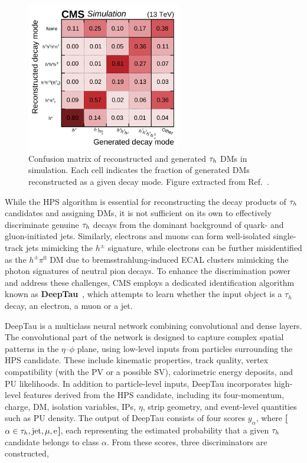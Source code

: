 \begin{figure}[h]
\centering
\includegraphics[width=0.6\textwidth]{Figures/Chapter4/HPS_DecayMode_Performance.pdf}
\caption[Hadronic tau decay mode confusion matrix]{Confusion matrix of reconstructed and generated $\tau_h$ \acp{DM} in simulation. Each cell indicates the fraction of generated \acp{DM} reconstructed as a given decay mode. Figure extracted from Ref.~\cite{DeepTau_20-001}.}
\label{Figure:Chapter4_HPS_ConfusionMatrix}
\end{figure}

While the \ac{HPS} algorithm is essential for reconstructing the decay products of $\tau_h$ candidates and assigning \acp{DM}, it is not sufficient on its own to effectively discriminate genuine $\tau_h$ decays from the dominant background of quark- and gluon-initiated jets. Similarly, electrons and muons can form well-isolated single-track jets mimicking the $h^\pm$ signature, while electrons can be further misidentified as the $h^\pm \pi^0$ \ac{DM} due to bremsstrahlung-induced \ac{ECAL} clusters mimicking the photon signatures of neutral pion decays. To enhance the discrimination power and address these challenges, \ac{CMS} employs a dedicated identification algorithm known as \textbf{DeepTau}~\cite{DeepTau_20-001,DeepTau_24-001}, which attempts to learn whether the input object is a $\tau_h$ decay, an electron, a muon or a jet. 

DeepTau is a multiclass neural network combining convolutional and dense layers. The convolutional part of the network is designed to capture complex spatial patterns in the $\eta$–$\phi$ plane, using low-level inputs from particles surrounding the \ac{HPS} candidate. These include kinematic properties, track quality, vertex compatibility (with the \ac{PV} or a possible \ac{SV}), calorimetric energy deposits, and \ac{PU} likelihoods. In addition to particle-level inputs, DeepTau incorporates high-level features derived from the \ac{HPS} candidate, including its four-momentum, charge, \ac{DM}, isolation variables, \acp{IP}, $\eta$, strip geometry, and event-level quantities such as \ac{PU} density. The output of DeepTau consists of four scores $y_\alpha$, where \textbf{[$\alpha \in {\PGt_h,\text{jet},\mu,\text{e}}$]}, each representing the estimated probability that a given $\tau_h$ candidate belongs to class $\alpha$. From these scores, three discriminators are constructed,

